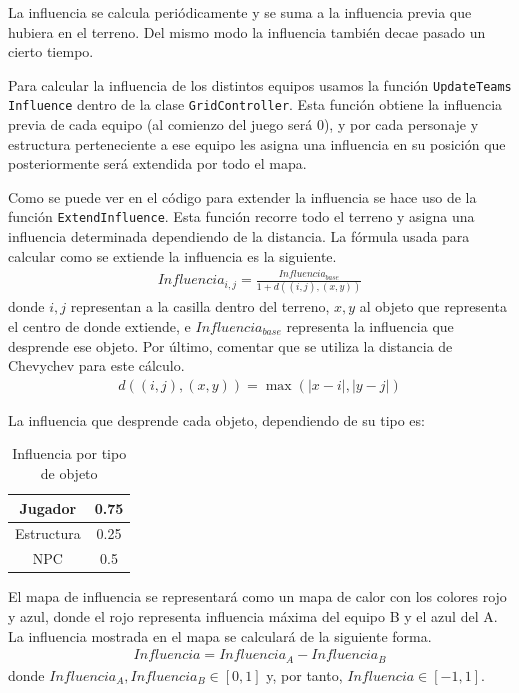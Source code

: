 La influencia se calcula periódicamente y se suma a la influencia previa que hubiera en el terreno. Del mismo modo la influencia también decae pasado un cierto tiempo.

Para calcular la influencia de los distintos equipos usamos la función \texttt{UpdateTeams Influence} dentro de la clase \texttt{GridController}. Esta función obtiene la influencia previa de cada equipo (al comienzo del juego será 0), y por cada personaje y estructura perteneciente a ese equipo les asigna una influencia en su posición que posteriormente será extendida por todo el mapa.

 

Como se puede ver en el código para extender la influencia se hace uso de la función \texttt{ExtendInfluence}. Esta función recorre todo el terreno y asigna una influencia determinada dependiendo de la distancia. La fórmula usada para calcular como se extiende la influencia es la siguiente.
\begin{gather*}
    Influencia_{i,j} = \frac{Influencia_{base}}{1 + d\left((i,j), (x,y)\right)}
\end{gather*}
donde $i,j$ representan a la casilla dentro del terreno, $x,y$ al objeto que representa el centro de donde extiende, e $Influencia_{base}$ representa la influencia que desprende ese objeto. Por último, comentar que se utiliza la distancia de Chevychev para este cálculo.
\begin{gather*}
    d\left((i,j), (x,y)\right) = \max \left( \lvert x - i \rvert, \lvert y - j \rvert \right)
\end{gather*}

La influencia que desprende cada objeto, dependiendo de su tipo es:

\begin{table}[H]
    \centering
    \begin{tabular}{|c|c|}
        \hline
        Jugador & 0.75 \\
        \hline
        Estructura & 0.25 \\
        \hline
        NPC & 0.5 \\
        \hline
    \end{tabular}
    \caption{Influencia por tipo de objeto}
    \label{tab:influencepertype}
\end{table}

El mapa de influencia se representará como un mapa de calor con los colores rojo y azul, donde el rojo representa influencia máxima del equipo B y el azul del A. La influencia mostrada en el mapa se calculará de la siguiente forma.
\begin{gather*}
    Influencia = Influencia_A - Influencia_B
\end{gather*}
donde $Influencia_A, Influencia_B \in [0,1]$ y, por tanto, $Influencia \in [-1, 1]$.

